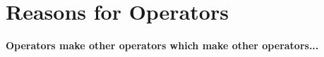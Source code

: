 



\chapter{Reasons for Operators}




\begin{center}
    \textbf{Operators make other operators which make other operators...}
\end{center}

% 


% 

% 

